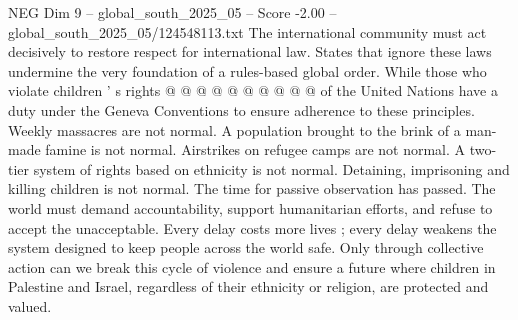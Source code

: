 \begin{textsample}{NEG Dim 9 – global\_south\_2025\_05 – Score -2.00 – global\_south\_2025\_05/124548113.txt}
The international community must act decisively to restore respect for international law.
States that ignore these laws undermine the very foundation of a rules-based global order.
While those who violate children ' s rights @ @ @ @ @ @ @ @ @ @ of the United Nations have a duty under the Geneva Conventions to ensure adherence to these principles.
Weekly massacres are not normal.
A population brought to the brink of a man-made famine is not normal.
Airstrikes on refugee camps are not normal.
A two-tier system of rights based on ethnicity is not normal.
Detaining, imprisoning and killing children is not normal.
The time for passive observation has passed.
The world must demand accountability, support humanitarian efforts, and refuse to accept the unacceptable.
Every delay costs more lives ; every delay weakens the system designed to keep people across the world safe.
Only through collective action can we break this cycle of violence and ensure a future where children in Palestine and Israel, regardless of their ethnicity or religion, are protected and valued.

\end{textsample}

